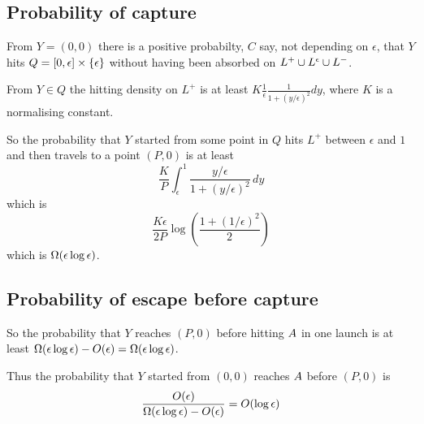 {\subsection{Probability of capture}

From $Y = (0,0)$ there is a positive probabilty, $C$ say, not
depending on $\epsilon$, that $Y$ hits $Q = [0, \epsilon] \times
\{\epsilon\}$ without having been absorbed on $L^+ \cup L^\epsilon \cup
L^-$.

From $Y \in Q$ the hitting density on $L^+$ is at least $K
\frac{1}{\epsilon} \frac{1}{1 + (y/\epsilon)^2} dy$, where $K$ is a
normalising constant.

So the probability that $Y$ started from some point in $Q$ hits $L^+$
between $\epsilon$ and $1$ and then travels to a point $(P,0)$ is at least
\[
\frac{K}{P} \int_{\epsilon}^{1} \frac{y/\epsilon}{1 + (y/\epsilon)^2}
\, dy
\]
which is
\[
\frac{K\epsilon}{2P} \log\left(\frac{1 + (1/\epsilon)^2}{2}\right)
\]
which is $\Omega(\epsilon\log\epsilon)$.

\subsection{Probability of escape before capture}

So the probability that $Y$ reaches $(P,0)$ before hitting
$A$ in one launch is at least
$\Omega(\epsilon\log\epsilon) - O(\epsilon) = \Omega(\epsilon\log\epsilon)
$.

Thus the probability that $Y$ started from $(0,0)$ reaches
$A$ before $(P,0)$ is
\[
\frac{O(\epsilon)}{\Omega(\epsilon\log\epsilon) - O(\epsilon)} = O(\log\epsilon)
\]

}
